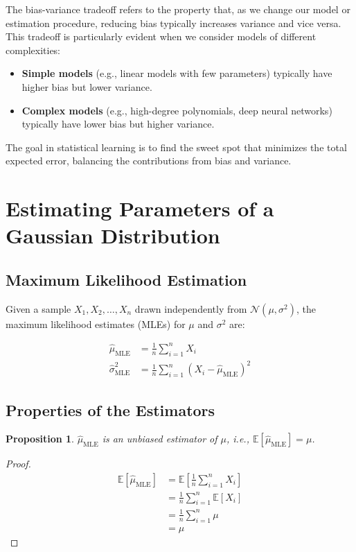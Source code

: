 \documentclass{article}
\newtheorem{proposition}[theorem]{Proposition}
\begin{document}
The bias-variance tradeoff refers to the property that, as we change our model or estimation procedure, reducing bias typically increases variance and vice versa. This tradeoff is particularly evident when we consider models of different complexities:

\begin{itemize}
\item \textbf{Simple models} (e.g., linear models with few parameters) typically have higher bias but lower variance.
\item \textbf{Complex models} (e.g., high-degree polynomials, deep neural networks) typically have lower bias but higher variance.
\end{itemize}

The goal in statistical learning is to find the sweet spot that minimizes the total expected error, balancing the contributions from bias and variance.

\section{Estimating Parameters of a Gaussian Distribution}

\subsection{Maximum Likelihood Estimation}

Given a sample $X_1, X_2, \ldots, X_n$ drawn independently from $\mathcal{N}(\mu, \sigma^2)$, the maximum likelihood estimates (MLEs) for $\mu$ and $\sigma^2$ are:

\begin{align*}
\hat{\mu}_{\text{MLE}} &= \frac{1}{n} \sum_{i=1}^n X_i \\
\hat{\sigma}^2_{\text{MLE}} &= \frac{1}{n} \sum_{i=1}^n (X_i - \hat{\mu}_{\text{MLE}})^2
\end{align*}

\subsection{Properties of the Estimators}

\begin{proposition}
$\hat{\mu}_{\text{MLE}}$ is an unbiased estimator of $\mu$, i.e., $\mathbb{E}[\hat{\mu}_{\text{MLE}}] = \mu$.
\end{proposition}

\begin{proof}
\begin{align*}
\mathbb{E}[\hat{\mu}_{\text{MLE}}] &= \mathbb{E}\left[\frac{1}{n} \sum_{i=1}^n X_i\right] \\
&= \frac{1}{n} \sum_{i=1}^n \mathbb{E}[X_i] \\
&= \frac{1}{n} \sum_{i=1}^n \mu \\
&= \mu
\end{align*}
\end{proof}
\end{document}
